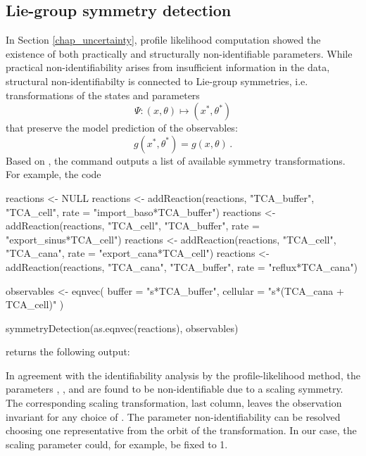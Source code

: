 \documentclass[article]{jss}
\begin{document}
\subsection{Lie-group symmetry detection}
In Section \ref{chap_uncertainty}, profile likelihood computation showed the existence of both practically and structurally non-identifiable parameters. While practical non-identifiability arises from insufficient information in the data, structural non-identifiabilty is connected to Lie-group symmetries, i.e. transformations of the states and parameters \[\Psi: (x,\theta) \longmapsto (x^*, \theta^*)\] that preserve the model prediction of the observables: \[g(x^*, \theta^*) = g(x,\theta)\,.\] Based on \cite{merkt2015higher}, the  command outputs a list of available symmetry transformations. For example, the code
\begin{CodeChunk}
\begin{CodeInput}
reactions <- NULL
reactions <- addReaction(reactions, "TCA_buffer", "TCA_cell", 
			 rate = "import_baso*TCA_buffer")
reactions <- addReaction(reactions, "TCA_cell", "TCA_buffer", 
			 rate = "export_sinus*TCA_cell")
reactions <- addReaction(reactions, "TCA_cell", "TCA_cana", 
			 rate = "export_cana*TCA_cell")
reactions <- addReaction(reactions, "TCA_cana", "TCA_buffer", 
			 rate = "reflux*TCA_cana")

observables <- eqnvec(
  buffer = "s*TCA_buffer",
  cellular = "s*(TCA_cana + TCA_cell)"
)

symmetryDetection(as.eqnvec(reactions), observables)
\end{CodeInput}
\end{CodeChunk}
returns the following output:
\begin{CodeChunk}
\end{CodeChunk}


In agreement with the identifiability analysis by the profile-likelihood method, the parameters , ,  and  are found to be non-identifiable due to a scaling symmetry. The corresponding scaling transformation, last column, leaves the observation invariant for any choice of . The parameter non-identifiability can be resolved choosing one representative from the orbit of the transformation. In our case, the scaling parameter could, for example, be fixed to 1. 
\end{document}
